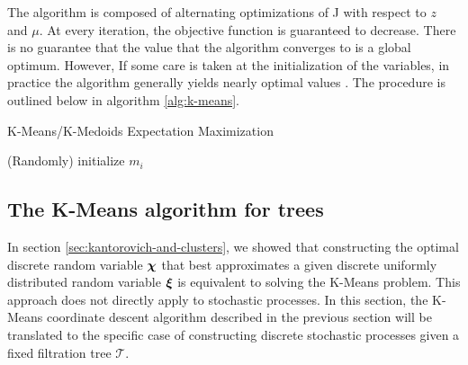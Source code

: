 The algorithm is composed of alternating optimizations of J with respect to $z$ and $\mu$.
At every iteration, the objective function is guaranteed to decrease.
There is no guarantee that the value that the algorithm converges to is a global optimum.
However, If some care is taken at the initialization of the variables, in practice the algorithm generally yields nearly optimal values \cite{Arthur2006}.
The procedure is outlined below in algorithm \ref{alg:k-means}.
\begin{algorithm}
  \label{alg:k-means}
  \caption{K-Means/K-Medoids Expectation Maximization}

  (Randomly) initialize $m_i$\;
\end{algorithm}
\subsection{The K-Means algorithm for trees}
\label{sec:k-means-algorithm-trees}
In section \ref{sec:kantorovich-and-clusters}, we showed that constructing the optimal discrete random variable $\boldsymbol\chi$ that best approximates a given discrete uniformly distributed random variable $\boldsymbol\xi$ is equivalent to solving the K-Means problem.
This approach does not directly apply to stochastic processes.
In this section, the K-Means coordinate descent algorithm described in the previous section will be translated to the specific case of constructing discrete stochastic processes given a fixed filtration tree $\mathcal{T}$.
